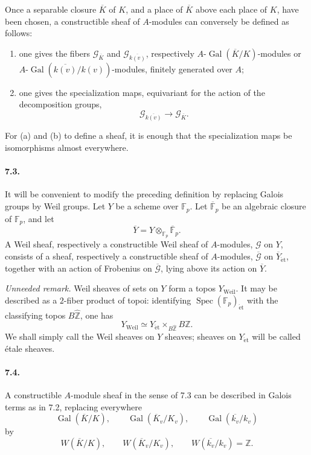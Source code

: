 \documentclass[10pt,letterpaper]{article}
\newcommand{\F}{\mathbb F}
\newcommand{\Gal}{\operatorname{Gal}}
\newcommand{\Spec}{\operatorname{Spec}}
\providecommand{\Spec}{\operatorname{Spec}}
\providecommand{\Gal}{\operatorname{Gal}}
\providecommand{\Gal}{\operatorname{Gal}}
\providecommand{\Spec}{\operatorname{Spec}}
\providecommand{\Spec}{\operatorname{Spec}}
\providecommand{\Gal}{\operatorname{Gal}}
\providecommand{\Gal}{\operatorname{Gal}}
\begin{document}
Once a separable closure \(\overline K\) of \(K\), and a place of \(\overline K\) above each place of \(K\), have been chosen, a constructible sheaf of \(A\)-modules can conversely be defined as follows:
\begin{enumerate}[label=(\alph*)]
\item one gives the fibers \(\mathcal G_{\overline K}\) and \(\mathcal G_{\overline{k(v)}}\), respectively \(A\)-\(\Gal(\overline K/K)\)-modules or \(A\)-\(\Gal(\overline{k(v)}/k(v))\)-modules, finitely generated over \(A\);
\item one gives the specialization maps, equivariant for the action of the decomposition groups,
\[
\mathcal G_{\overline{k(v)}}\longrightarrow\mathcal G_{\overline K}.
\]
\end{enumerate}
For (a) and (b) to define a sheaf, it is enough that the specialization maps be isomorphisms almost everywhere.

\paragraph{7.3.} It will be convenient to modify the preceding definition by replacing Galois groups by Weil groups. Let \(Y\) be a scheme over \(\F_p\). Let \(\overline{\F}_p\) be an algebraic closure of \(\F_p\), and let
\[
\overline Y=Y\otimes_{\F_p}\overline{\F}_p.
\]
A Weil sheaf, respectively a constructible Weil sheaf of \(A\)-modules, \(\mathcal G\) on \(Y\), consists of a sheaf, respectively a constructible sheaf of \(A\)-modules, \(\overline{\mathcal G}\) on \(\overline Y_{\mathrm{\acute et}}\), together with an action of Frobenius on \(\overline{\mathcal G}\), lying above its action on \(\overline Y\).

\emph{Unneeded remark.} Weil sheaves of sets on \(Y\) form a topos \(Y_{\mathrm{Weil}}\). It may be described as a \(2\)-fiber product of topoi: identifying \(\Spec(\F_p)_{\mathrm{\acute et}}\) with the classifying topos \(B\widehat{\mathbb Z}\), one has
\[
Y_{\mathrm{Weil}}\simeq
Y_{\mathrm{\acute et}}\times_{B\widehat{\mathbb Z}}B\mathbb Z.
\]
We shall simply call the Weil sheaves on \(Y\) sheaves; sheaves on \(Y_{\mathrm{\acute et}}\) will be called étale sheaves.

\paragraph{7.4.} A constructible \(A\)-module sheaf in the sense of 7.3 can be described in Galois terms as in 7.2, replacing everywhere
\[
\Gal(\overline K/K),\qquad
\Gal(\overline K_v/K_v),\qquad
\Gal(\overline{k_v}/k_v)
\]
by
\[
W(\overline K/K),\qquad
W(\overline K_v/K_v),\qquad
W(\overline{k_v}/k_v)=\mathbb Z.
\]
\end{document}
